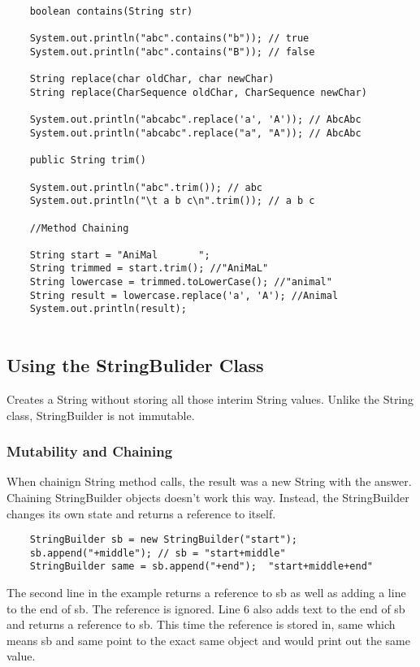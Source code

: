 \documentclass[a4paper]{report}   %
\begin{document}
\begin{lstlisting}
	boolean contains(String str)
	
	System.out.println("abc".contains("b")); // true
	System.out.println("abc".contains("B")); // false
	
	String replace(char oldChar, char newChar)
	String replace(CharSequence oldChar, CharSequence newChar)
	
	System.out.println("abcabc".replace('a', 'A')); // AbcAbc
	System.out.println("abcabc".replace("a", "A")); // AbcAbc
	
	public String trim()
	
	System.out.println("abc".trim()); // abc
	System.out.println("\t a b c\n".trim()); // a b c
	
	//Method Chaining
	
	String start = "AniMal       ";
	String trimmed = start.trim(); //"AniMaL"
	String lowercase = trimmed.toLowerCase(); //"animal"
	String result = lowercase.replace('a', 'A'); //Animal
	System.out.println(result);
	
\end{lstlisting}

\subsection{Using the StringBulider Class}
Creates a String without storing all those interim String values. Unlike the String class, StringBuilder is not immutable.

\subsubsection{Mutability and Chaining}

When chainign String method calls, the result was a new String with the answer. Chaining StringBuilder objects doesn't work this way. Instead, the StringBuilder changes its own state and returns a reference to itself.

\begin{lstlisting}
	StringBuilder sb = new StringBuilder("start");
	sb.append("+middle"); // sb = "start+middle"
	StringBuilder same = sb.append("+end");  "start+middle+end"

\end{lstlisting}

The second line in the example returns a reference to sb as well as adding a line to the end of sb. The reference is ignored. Line 6 also adds text to the end of sb and returns a reference to sb. This time the reference is stored in, same which means sb and same point to the exact same object and would print out the same value.
\end{document}
